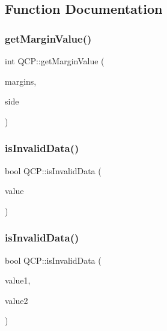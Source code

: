 \subsection{Function Documentation}
\mbox{\label{namespace_q_c_p_a23a2679d3495c444acc26acc61e35b5b}} 
\subsubsection{\texorpdfstring{get\+Margin\+Value()}{getMarginValue()}}
{\footnotesize\ttfamily int Q\+C\+P\+::get\+Margin\+Value (\begin{DoxyParamCaption}\item[{const Q\+Margins \&}]{margins,  }\item[{\hyperlink{namespace_q_c_p_a7e487e3e2ccb62ab7771065bab7cae54}{Q\+C\+P\+::\+Margin\+Side}}]{side }\end{DoxyParamCaption})\hspace{0.3cm}{\ttfamily [inline]}}

\mbox{\label{namespace_q_c_p_a07ab701c05329089f933b9cae2638a63}} 
\subsubsection{\texorpdfstring{is\+Invalid\+Data()}{isInvalidData()}\hspace{0.1cm}{\footnotesize\ttfamily [1/2]}}
{\footnotesize\ttfamily bool Q\+C\+P\+::is\+Invalid\+Data (\begin{DoxyParamCaption}\item[{double}]{value }\end{DoxyParamCaption})\hspace{0.3cm}{\ttfamily [inline]}}

\mbox{\label{namespace_q_c_p_a728903e5c3dd17847bee280f4005496f}} 
\subsubsection{\texorpdfstring{is\+Invalid\+Data()}{isInvalidData()}\hspace{0.1cm}{\footnotesize\ttfamily [2/2]}}
{\footnotesize\ttfamily bool Q\+C\+P\+::is\+Invalid\+Data (\begin{DoxyParamCaption}\item[{double}]{value1,  }\item[{double}]{value2 }\end{DoxyParamCaption})\hspace{0.3cm}{\ttfamily [inline]}}

